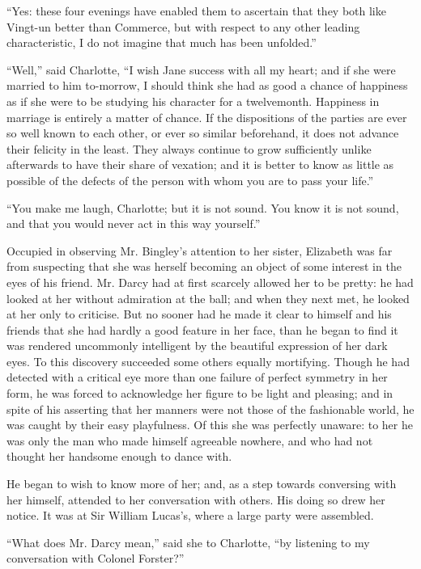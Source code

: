 \documentclass[12pt]{book}
\begin{document}
``Yes: these four evenings have enabled them to ascertain that they both like Vingt-un better than Commerce, but with respect to any other leading characteristic, I do not imagine that much has been unfolded.''

``Well,'' said Charlotte, ``I wish Jane success with all my heart; and if she were married to him to-morrow, I should think she had as good a chance of happiness as if she were to be studying his character for a twelvemonth. Happiness in marriage is entirely a matter of chance. If the dispositions of the parties are ever so well known to each other, or ever so similar beforehand, it does not advance their felicity in the least. They always continue to grow sufficiently unlike afterwards to have their share of vexation; and it is better to know as little as possible of the defects of the person with whom you are to pass your life.''

``You make me laugh, Charlotte; but it is not sound. You know it is not sound, and that you would never act in this way yourself.''

Occupied in observing Mr. Bingley's attention to her sister, Elizabeth was far from suspecting that she was herself becoming an object of some interest in the eyes of his friend. Mr. Darcy had at first scarcely allowed her to be pretty: he had looked at her without admiration at the ball; and when they next met, he looked at her only to criticise. But no sooner had he made it clear to himself and his friends that she had hardly a good feature in her face, than he began to find it was rendered uncommonly intelligent by the beautiful expression of her dark eyes. To this discovery succeeded some others equally mortifying. Though he had detected with a critical eye more than one failure of perfect symmetry in her form, he was forced to acknowledge her figure to be light and pleasing; and in spite of his asserting that her manners were not those of the fashionable world, he was caught by their easy playfulness. Of this she was perfectly unaware: to her he was only the man who made himself agreeable nowhere, and who had not thought her handsome enough to dance with.

He began to wish to know more of her; and, as a step towards conversing with her himself, attended to her conversation with others. His doing so drew her notice. It was at Sir William Lucas's, where a large party were assembled.

``What does Mr. Darcy mean,'' said she to Charlotte, ``by listening to my conversation with Colonel Forster?''
\end{document}
